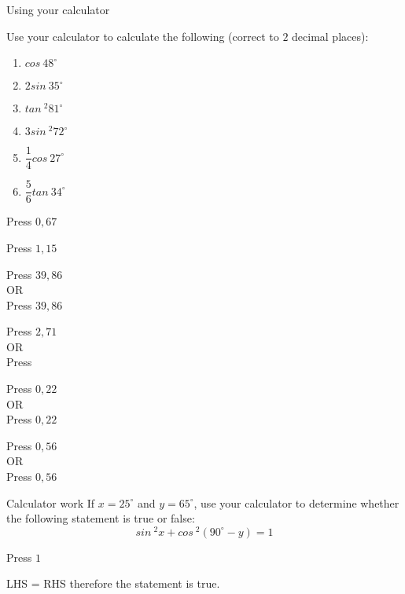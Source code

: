 \begin{wex}{Using your calculator}
{
\begin{minipage}{\textwidth}
Use your calculator to calculate the following (correct to $2$ decimal places):
  \begin{enumerate}[itemsep=4pt, label=\textbf{\arabic*}. ] 
  \item $cos~ 48^{\circ}$
  \item $2 sin~ 35^{\circ}$
  \item $tan~^{2} 81^{\circ}$
  \item $3 sin~^{2} 72^{\circ}$
  \item $\dfrac{1}{4} cos~ 27^{\circ}$
  \item $\dfrac{5}{6} tan~ 34^{\circ}$
  \end{enumerate}
\end{minipage}
}
{
\westep{}
Press   \fbox{\LARGE =} $0,67$

\westep{}
Press    \fbox{\LARGE =} $1,15$

\westep{}
Press \fbox{(}   \fbox{)}   \fbox{\LARGE =} $39,86$
\\
OR\\
Press   \fbox{\LARGE =}   \fbox{\LARGE =} $39,86$

\westep{}
Press  \fbox{(}   \fbox{)}  \fbox{\LARGE =} $2,71$
\\
OR\\
Press   \fbox{\LARGE =}   \fbox{\LARGE =}  \fbox{$\times$} 

\westep{}
Press \fbox{(}  \fbox{$\div$}  \fbox{)}   \fbox{\LARGE =} $0,22$
\\
OR\\
Press   \fbox{\LARGE =}  \fbox{$\div$}  \fbox{\LARGE =} $0,22$

\westep{}
Press \fbox{(}  \fbox{$\div$}  \fbox{)}   \fbox{\LARGE =} $0,56$
\\
OR\\
Press   \fbox{\LARGE =}  \fbox{$\times$}  \fbox{$\div$}  \fbox{\LARGE =} $0,56$
}
\end{wex}

\begin{wex}
{Calculator work}
{If $x=25^{\circ}$ and $y=65^{\circ}$, use your calculator to determine whether the following statement is true or false:
\begin{equation*}
  sin~^{2} x + cos~^{2} (90^{\circ}-y) = 1
\end{equation*}
}
{
Press \fbox{(}   \fbox{)}  \fbox{\LARGE +} \fbox{(}  \fbox{(}  \fbox{\LARGE -}  \fbox{)} \fbox{)}   \fbox{\LARGE =} $1$


LHS = RHS therefore the statement is true.
}
\end{wex}

